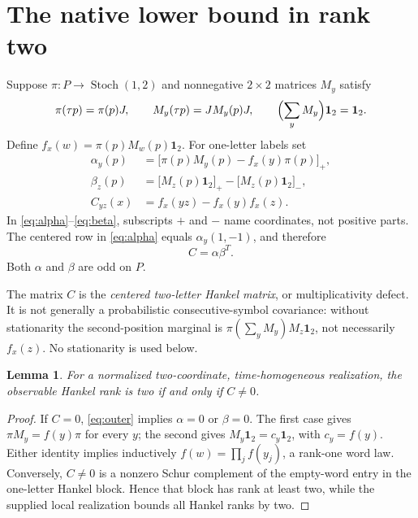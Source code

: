 \documentclass[11pt]{article}
\newtheorem{lemma}[theorem]{Lemma}
\theoremstyle{definition}
\newcommand{\one}{\mathbf 1}
\newcommand{\St}{\operatorname{Stoch}}
\begin{document}
\section{The native lower bound in rank two}
Suppose $\pi:P\to\St(1,2)$ and nonnegative $2\times2$ matrices $M_y$ satisfy
\[
 \pi(\tau p)=\pi(p)J,\qquad M_y(\tau p)=JM_y(p)J,
 \qquad \Bigl(\sum_yM_y\Bigr)\one_2=\one_2.
\]
Define $f_x(w)=\pi(p)M_w(p)\one_2$. For one-letter labels set
\begin{align}
 \alpha_y(p)&=\bigl[\pi(p)M_y(p)-f_x(y)\pi(p)\bigr]_+,\label{eq:alpha}\\
 \beta_z(p)&=\bigl[M_z(p)\one_2\bigr]_+-\bigl[M_z(p)\one_2\bigr]_-,\label{eq:beta}\\
 C_{yz}(x)&=f_x(yz)-f_x(y)f_x(z).\label{eq:C}
\end{align}
In \eqref{eq:alpha}--\eqref{eq:beta}, subscripts $+$ and $-$ name coordinates, not positive parts. The centered row in \eqref{eq:alpha} equals $\alpha_y(1,-1)$, and therefore
\begin{equation}\label{eq:outer}
 C=\alpha\beta^T.
\end{equation}
Both $\alpha$ and $\beta$ are odd on $P$.

The matrix $C$ is the \emph{centered two-letter Hankel matrix}, or multiplicativity defect. It is not generally a probabilistic consecutive-symbol covariance: without stationarity the second-position marginal is $\pi(\sum_yM_y)M_z\one_2$, not necessarily $f_x(z)$. No stationarity is used below.

\begin{lemma}\label{lem:ranktwo}
For a normalized two-coordinate, time-homogeneous realization, the observable Hankel rank is two if and only if $C\ne0$.
\end{lemma}
\begin{proof}
If $C=0$, \eqref{eq:outer} implies $\alpha=0$ or $\beta=0$. The first case gives $\pi M_y=f(y)\pi$ for every $y$; the second gives $M_y\one_2=c_y\one_2$, with $c_y=f(y)$. Either identity implies inductively $f(w)=\prod_j f(y_j)$, a rank-one word law. Conversely, $C\ne0$ is a nonzero Schur complement of the empty-word entry in the one-letter Hankel block. Hence that block has rank at least two, while the supplied local realization bounds all Hankel ranks by two.
\end{proof}
\end{document}
